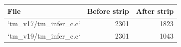 \begin{tabular}{lrr}
\toprule
File & Before strip & After strip \\
\midrule
`tm\_v17/tm\_infer\_c.c` & 2301 & 1823 \\
`tm\_v19/tm\_infer\_c.c` & 2301 & 1043 \\
\bottomrule
\end{tabular}
